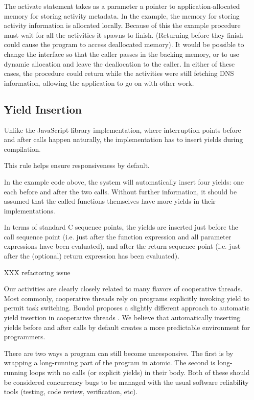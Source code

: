 \documentclass[acmsmall,anonymous,review]{acmart}\settopmatter{printfolios=true,printccs=false,printacmref=false}
\begin{document}
The activate statement takes as a parameter a pointer to application-allocated memory for storing activity metadata.
In the example, the memory for storing activity information is allocated locally.
Because of this the example procedure must wait for all the activities it spawns to finish.
(Returning before they finish could cause the program to access deallocated memory).
It would be possible to change the interface so that the caller passes in the backing memory, or to use dynamic allocation and leave the deallocation to the caller.
In either of these cases, the procedure could return while the activities were still fetching DNS information, allowing the application to go on with other work.

\subsection{Yield Insertion}

Unlike the JavaScript library implementation, where interruption points before and after calls happen naturally, the \charcoal{} implementation has to insert yields during compilation.

This rule helps ensure responsiveness by default.

In the example code above, the system will automatically insert four yields: one each before and after the two calls.
Without further information, it should be assumed that the called functions themselves have more yields in their implementations.

In terms of standard C sequence points, the yields are inserted just before the call sequence point (i.e. just after the function expression and all parameter expressions have been evaluated), and after the return sequence point (i.e. just after the (optional) return expression has been evaluated).

XXX refactoring issue

Our activities are clearly closely related to many flavors of cooperative threads.
Most commonly, cooperative threads rely on programs explicitly invoking yield to permit task switching.
Boudol proposes a slightly different approach to automatic yield insertion in cooperative threads \cite{Boudol2007}.
We believe that automatically inserting yields before and after calls by default creates a more predictable environment for programmers.


There are two ways a program can still become unresponsive.
The first is by wrapping a long-running part of the program in atomic.
The second is long-running loops with no calls (or explicit yields) in their body.
Both of these should be considered concurrency bugs to be managed with the usual software reliability tools (testing, code review, verification, etc).
\end{document}

